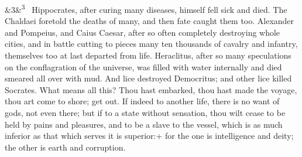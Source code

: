 \documentclass[12pt]{article}
\newcommand{\para}[1][]{\par\noindent\ifx&#1&\else\textsuperscript{\footnotesize #1}~\fi}
\begin{document}
\para[3] Hippocrates, after curing many diseases, himself fell sick and died.
The Chaldaei foretold the deaths of many, and then fate caught them too.
Alexander and Pompeius, and Caius Caesar, after so often completely
destroying whole cities, and in battle cutting to pieces many ten
thousands of cavalry and infantry, themselves too at last departed from
life. Heraclitus, after so many speculations on the conflagration of the
universe, was filled with water internally and died smeared all over
with mud. And lice destroyed Democritus; and other lice killed Socrates.
What means all this? Thou hast embarked, thou hast made the voyage, thou
art come to shore; get out. If indeed to another life, there is no want
of gods, not even there; but if to a state without sensation, thou wilt
cease to be held by pains and pleasures, and to be a slave to the
vessel, which is as much inferior as that which serves it is superior:+
for the one is intelligence and deity; the other is earth and
corruption.
\end{document}
